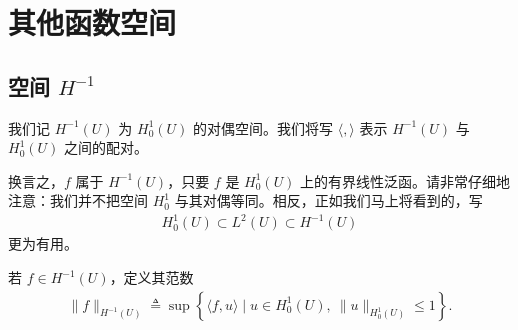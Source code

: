 \documentclass[../../main.tex]{subfiles}
\begin{document}
\section{其他函数空间}\label{section:ch05-其他函数空间}

\subsection{空间 $H^{-1}$}\label{subsection:ch05-H-1}

\begin{definition}\label{definition:ch05-H-1}
我们记 $H^{-1}(U)$ 为 $H^{1}_{0}(U)$ 的对偶空间。我们将写 $\langle,\rangle$ 表示 $H^{-1}(U)$ 与 $H^{1}_{0}(U)$ 之间的配对。
\end{definition}
\begin{remark}
换言之，$f$ 属于 $H^{-1}(U)$，只要 $f$ 是 $H^{1}_{0}(U)$ 上的有界线性泛函。请非常仔细地注意：我们并不把空间 $H^{1}_{0}$ 与其对偶等同。相反，正如我们马上将看到的，写
\begin{align*}
H^{1}_{0}(U)\subset L^{2}(U)\subset H^{-1}(U)
\end{align*}
更为有用。
\end{remark}

\begin{definition}\label{definition:ch05-H-1范数}
若 $f\in H^{-1}(U)$，定义其范数
\begin{align*}
\|f\|_{H^{-1}(U)}\triangleq\sup\left\{\langle f,u\rangle\mid u\in H^{1}_{0}(U),\ \|u\|_{H^{1}_{0}(U)}\leqslant 1\right\}.
\end{align*}
\end{definition}
\end{document}
